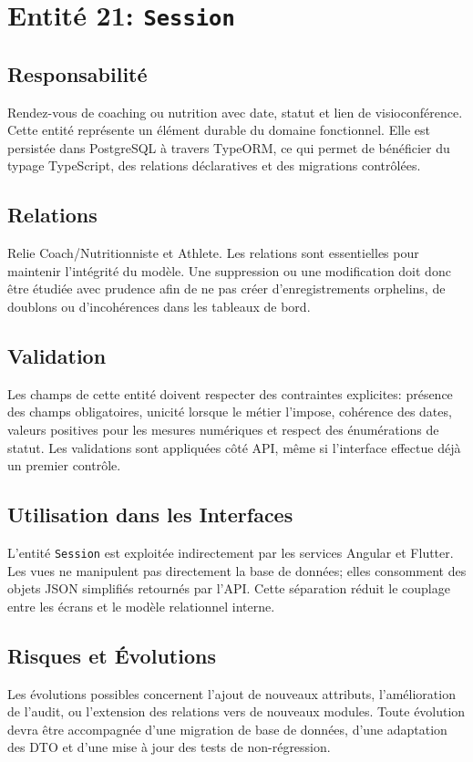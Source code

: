 \section{Entité 21: \texttt{Session}}
\subsection{Responsabilité}
Rendez-vous de coaching ou nutrition avec date, statut et lien de visioconférence. Cette entité représente un élément durable du domaine fonctionnel. Elle est persistée dans PostgreSQL à travers TypeORM, ce qui permet de bénéficier du typage TypeScript, des relations déclaratives et des migrations contrôlées.

\subsection{Relations}
Relie Coach/Nutritionniste et Athlete. Les relations sont essentielles pour maintenir l'intégrité du modèle. Une suppression ou une modification doit donc être étudiée avec prudence afin de ne pas créer d'enregistrements orphelins, de doublons ou d'incohérences dans les tableaux de bord.

\subsection{Validation}
Les champs de cette entité doivent respecter des contraintes explicites: présence des champs obligatoires, unicité lorsque le métier l'impose, cohérence des dates, valeurs positives pour les mesures numériques et respect des énumérations de statut. Les validations sont appliquées côté API, même si l'interface effectue déjà un premier contrôle.

\subsection{Utilisation dans les Interfaces}
L'entité \texttt{Session} est exploitée indirectement par les services Angular et Flutter. Les vues ne manipulent pas directement la base de données; elles consomment des objets JSON simplifiés retournés par l'API. Cette séparation réduit le couplage entre les écrans et le modèle relationnel interne.

\subsection{Risques et Évolutions}
Les évolutions possibles concernent l'ajout de nouveaux attributs, l'amélioration de l'audit, ou l'extension des relations vers de nouveaux modules. Toute évolution devra être accompagnée d'une migration de base de données, d'une adaptation des DTO et d'une mise à jour des tests de non-régression.

